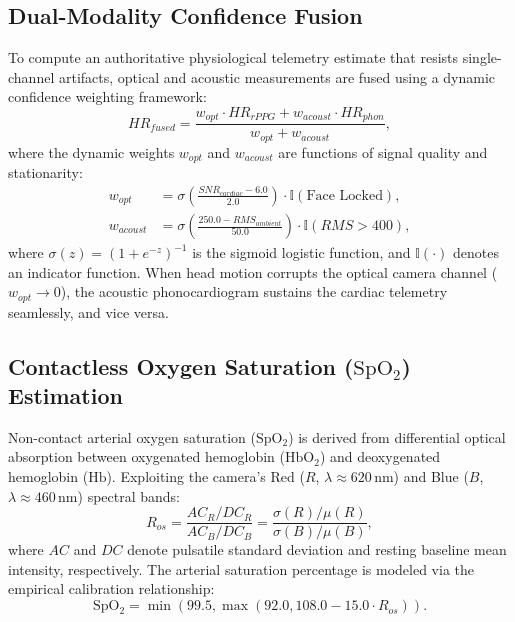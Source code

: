 \documentclass[journal]{IEEEtran}
\begin{document}
\subsection{Dual-Modality Confidence Fusion}

To compute an authoritative physiological telemetry estimate that resists single-channel artifacts, optical and acoustic measurements are fused using a dynamic confidence weighting framework:
\begin{equation}
    HR_{fused} = \frac{w_{opt} \cdot HR_{rPPG} + w_{acoust} \cdot HR_{phon}}{w_{opt} + w_{acoust}},
    \label{eq:fusion}
\end{equation}
where the dynamic weights $w_{opt}$ and $w_{acoust}$ are functions of signal quality and stationarity:
\begin{align}
    w_{opt} &= \sigma\left( \frac{SNR_{cardiac} - 6.0}{2.0} \right) \cdot \mathbb{I}(\text{Face Locked}), \\
    w_{acoust} &= \sigma\left( \frac{250.0 - RMS_{ambient}}{50.0} \right) \cdot \mathbb{I}(RMS > 400),
\end{align}
where $\sigma(z) = (1 + e^{-z})^{-1}$ is the sigmoid logistic function, and $\mathbb{I}(\cdot)$ denotes an indicator function. When head motion corrupts the optical camera channel ($w_{opt} \to 0$), the acoustic phonocardiogram sustains the cardiac telemetry seamlessly, and vice versa.

\subsection{Contactless Oxygen Saturation ($\mathrm{SpO_2}$) Estimation}

Non-contact arterial oxygen saturation ($\mathrm{SpO_2}$) is derived from differential optical absorption between oxygenated hemoglobin ($\mathrm{HbO_2}$) and deoxygenated hemoglobin ($\mathrm{Hb}$). Exploiting the camera's Red ($R$, $\lambda \approx 620$\,nm) and Blue ($B$, $\lambda \approx 460$\,nm) spectral bands:
\begin{equation}
    R_{os} = \frac{AC_R / DC_R}{AC_B / DC_B} = \frac{\sigma(R) / \mu(R)}{\sigma(B) / \mu(B)},
    \label{eq:ratio_ratios}
\end{equation}
where $AC$ and $DC$ denote pulsatile standard deviation and resting baseline mean intensity, respectively. The arterial saturation percentage is modeled via the empirical calibration relationship:
\begin{equation}
    \mathrm{SpO_2} = \min\left(99.5, \max\left(92.0, 108.0 - 15.0 \cdot R_{os}\right)\right).
    \label{eq:spo2}
\end{equation}
\end{document}

